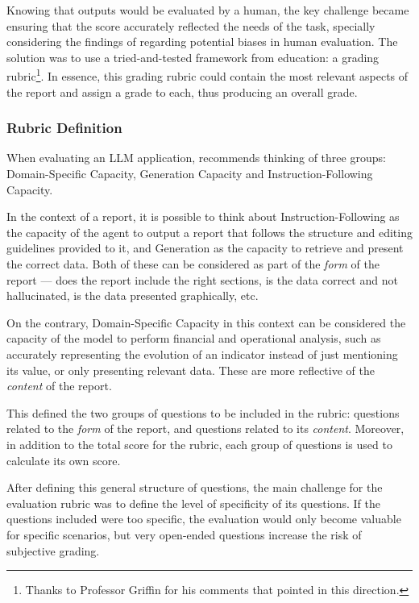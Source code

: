 \documentclass[a4paper]{report}
\begin{document}
Knowing that outputs would be evaluated by a human, the key challenge became ensuring that the score accurately reflected the needs of the task, specially considering the findings of \cite{hu2023decipher} regarding potential biases in human evaluation. The solution was to use a tried-and-tested framework from education: a grading rubric\footnote{Thanks to Professor Griffin for his comments that pointed in this direction.}. In essence, this grading rubric could contain the most relevant aspects of the report and assign a grade to each, thus producing an overall grade. 

\subsubsection{Rubric Definition}

When evaluating an LLM application, \cite{aiebook2025} recommends thinking of three groups: Domain-Specific Capacity, Generation Capacity and Instruction-Following Capacity.

In the context of a report, it is possible to think about Instruction-Following as the capacity of the agent to output a report that follows the structure and editing guidelines provided to it, and Generation as the capacity to retrieve and present the correct data. Both of these can be considered as part of the \textit{form} of the report --- does the report include the right sections, is the data correct and not hallucinated, is the data presented graphically, etc.

On the contrary, Domain-Specific Capacity in this context can be considered the capacity of the model to perform financial and operational analysis, such as accurately representing the evolution of an indicator instead of just mentioning its value, or only presenting relevant data. These are more reflective of the \textit{content} of the report.

This defined the two groups of questions to be included in the rubric: questions related to the \textit{form} of the report, and questions related to its \textit{content}. Moreover, in addition to the total score for the rubric, each group of questions is used to calculate its own score.

After defining this general structure of questions, the main challenge for the evaluation rubric was to define the level of specificity of its questions. If the questions included were too specific, the evaluation would only become valuable for specific scenarios, but very open-ended questions increase the risk of subjective grading.
\end{document}
